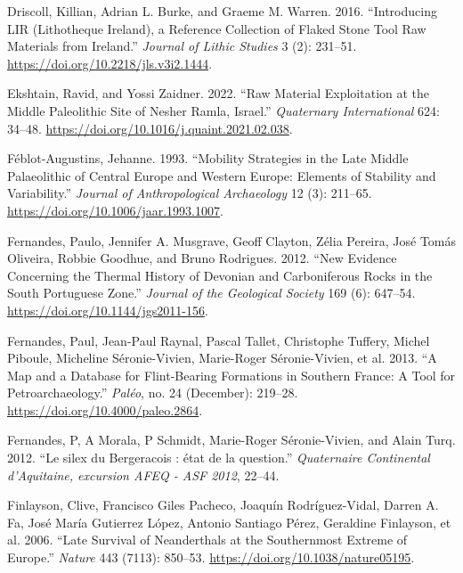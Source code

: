 \documentclass[
  a4paper,
  DIV=11,
  numbers=noendperiod]{scrreprt}
\newlength{\cslhangindent}
\newenvironment{CSLReferences}[2] %
 {\begin{list}{}{%
  \setlength{\itemindent}{0pt}
  \setlength{\leftmargin}{0pt}
  \setlength{\parsep}{0pt}
  \ifodd #1
   \setlength{\leftmargin}{\cslhangindent}
   \setlength{\itemindent}{-1\cslhangindent}
  \fi
  \setlength{\itemsep}{#2\baselineskip}}}
 {\end{list}}
\begin{document}
\begin{CSLReferences}{1}{0}
Driscoll, Killian, Adrian L. Burke, and Graeme M. Warren. 2016.
{``Introducing {LIR} ({Lithotheque Ireland}), a Reference Collection of
Flaked Stone Tool Raw Materials from {Ireland}.''} \emph{Journal of
Lithic Studies} 3 (2): 231--51.
\url{https://doi.org/10.2218/jls.v3i2.1444}.

Ekshtain, Ravid, and Yossi Zaidner. 2022. {``Raw Material Exploitation
at the {Middle Paleolithic} Site of {Nesher Ramla}, {Israel}.''}
\emph{Quaternary International} 624: 34--48.
\url{https://doi.org/10.1016/j.quaint.2021.02.038}.

Féblot-Augustins, Jehanne. 1993. {``Mobility {Strategies} in the {Late
Middle Palaeolithic} of {Central Europe} and {Western Europe}:
{Elements} of {Stability} and {Variability}.''} \emph{Journal of
Anthropological Archaeology} 12 (3): 211--65.
\url{https://doi.org/10.1006/jaar.1993.1007}.

Fernandes, Paulo, Jennifer A. Musgrave, Geoff Clayton, Zélia Pereira,
José Tomás Oliveira, Robbie Goodhue, and Bruno Rodrigues. 2012. {``New
Evidence Concerning the Thermal History of {Devonian} and
{Carboniferous} Rocks in the {South Portuguese Zone}.''} \emph{Journal
of the Geological Society} 169 (6): 647--54.
\url{https://doi.org/10.1144/jgs2011-156}.

Fernandes, Paul, Jean-Paul Raynal, Pascal Tallet, Christophe Tuffery,
Michel Piboule, Micheline Séronie-Vivien, Marie-Roger Séronie-Vivien, et
al. 2013. {``A Map and a Database for Flint-Bearing Formations in
{Southern France}: {A} Tool for {Petroarchaeology}.''} \emph{Pal{é}o},
no. 24 (December): 219--28. \url{https://doi.org/10.4000/paleo.2864}.

Fernandes, P, A Morala, P Schmidt, Marie-Roger Séronie-Vivien, and Alain
Turq. 2012. {``{Le silex du Bergeracois : {é}tat de la question}.''}
\emph{Quaternaire Continental d'Aquitaine, excursion AFEQ - ASF 2012},
22--44.

Finlayson, Clive, Francisco Giles Pacheco, Joaquín Rodríguez-Vidal,
Darren A. Fa, José María Gutierrez López, Antonio Santiago Pérez,
Geraldine Finlayson, et al. 2006. {``Late Survival of {Neanderthals} at
the Southernmost Extreme of {Europe}.''} \emph{Nature} 443 (7113):
850--53. \url{https://doi.org/10.1038/nature05195}.


\end{CSLReferences}
\end{document}
